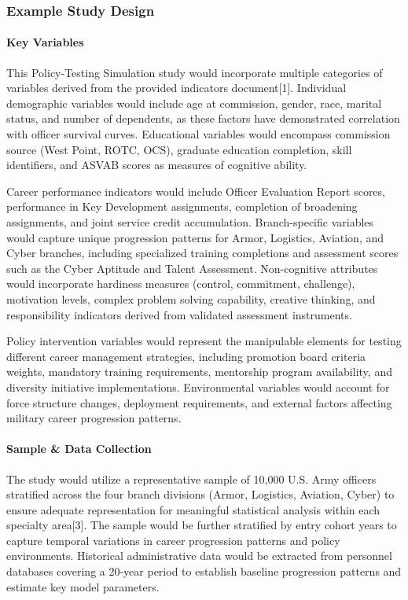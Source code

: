 \documentclass[main.tex]{subfiles}
\begin{document}
\subsubsection{Example Study Design}

\paragraph{Key Variables}

This Policy-Testing Simulation study would incorporate multiple categories of variables derived from the provided indicators document[1]. Individual demographic variables would include age at commission, gender, race, marital status, and number of dependents, as these factors have demonstrated correlation with officer survival curves. Educational variables would encompass commission source (West Point, ROTC, OCS), graduate education completion, skill identifiers, and ASVAB scores as measures of cognitive ability.

Career performance indicators would include Officer Evaluation Report scores, performance in Key Development assignments, completion of broadening assignments, and joint service credit accumulation. Branch-specific variables would capture unique progression patterns for Armor, Logistics, Aviation, and Cyber branches, including specialized training completions and assessment scores such as the Cyber Aptitude and Talent Assessment. Non-cognitive attributes would incorporate hardiness measures (control, commitment, challenge), motivation levels, complex problem solving capability, creative thinking, and responsibility indicators derived from validated assessment instruments.

Policy intervention variables would represent the manipulable elements for testing different career management strategies, including promotion board criteria weights, mandatory training requirements, mentorship program availability, and diversity initiative implementations. Environmental variables would account for force structure changes, deployment requirements, and external factors affecting military career progression patterns.

\paragraph{Sample \& Data Collection}

The study would utilize a representative sample of 10,000 U.S. Army officers stratified across the four branch divisions (Armor, Logistics, Aviation, Cyber) to ensure adequate representation for meaningful statistical analysis within each specialty area[3]. The sample would be further stratified by entry cohort years to capture temporal variations in career progression patterns and policy environments. Historical administrative data would be extracted from personnel databases covering a 20-year period to establish baseline progression patterns and estimate key model parameters.
\end{document}
